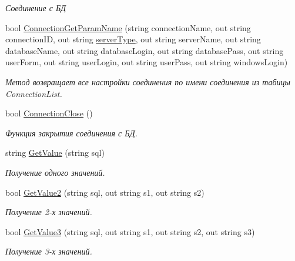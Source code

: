 \begin{DoxyCompactItemize}
\begin{DoxyCompactList}\small\item\em Соединение с БД \end{DoxyCompactList}\item 
bool \mbox{\hyperlink{class_f_b_a_1_1_connection_a9f13d1affbfe468eeaca4daffa9b21d1}{Connection\+Get\+Param\+Name}} (string connection\+Name, out string connection\+ID, out string \mbox{\hyperlink{class_f_b_a_1_1_connection_ad5c6e7969020c242db56e1910c6e353f}{server\+Type}}, out string server\+Name, out string database\+Name, out string database\+Login, out string database\+Pass, out string user\+Form, out string user\+Login, out string user\+Pass, out string windows\+Login)
\begin{DoxyCompactList}\small\item\em Метод возвращает все настройки соединения по имени соединения из табицы Connection\+List. \end{DoxyCompactList}\item 
bool \mbox{\hyperlink{class_f_b_a_1_1_connection_a766238aedcab93fcd7d4836db4550e31}{Connection\+Close}} ()
\begin{DoxyCompactList}\small\item\em Функция закрытия соединения с БД. ~\newline
\end{DoxyCompactList}\item 
string \mbox{\hyperlink{class_f_b_a_1_1_connection_a9d5433bfc95420f963f932439dd5a838}{Get\+Value}} (string sql)
\begin{DoxyCompactList}\small\item\em Получение одного значений. \end{DoxyCompactList}\item 
bool \mbox{\hyperlink{class_f_b_a_1_1_connection_a01944c325a50484e95d952ac35445380}{Get\+Value2}} (string sql, out string s1, out string s2)
\begin{DoxyCompactList}\small\item\em Получение 2-\/х значений. \end{DoxyCompactList}\item 
bool \mbox{\hyperlink{class_f_b_a_1_1_connection_abeada204d24cae01cbf5f73e0b505e99}{Get\+Value3}} (string sql, out string s1, out string s2, out string s3)
\begin{DoxyCompactList}\small\item\em Получение 3-\/х значений. \end{DoxyCompactList}\item 

\end{DoxyCompactItemize}
